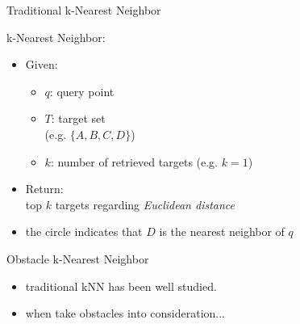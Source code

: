 \begin{frame}{Traditional k-Nearest Neighbor}
\begin{minipage}{.5\textwidth}
\small k-Nearest Neighbor:
\begin{itemize}
    \item<1-> \small Given:
    \begin{itemize}
        \item<2-> \small $q$: query point
        \item<3-> \small $T$: target set\\\tiny(e.g. $\{A,B,C,D\}$)
        \item<4-> \small $k$: number of retrieved targets \tiny(e.g. $k=1$)
    \end{itemize}
    \item<5-> \small Return:\\top $k$ targets regarding \textit{Euclidean distance}
    \item<6-> \small the circle indicates that $D$ is the nearest neighbor of $q$
\end{itemize}
\end{minipage}%
\begin{minipage}{.5\textwidth}
\begin{adjustbox}{max totalsize={.9\textwidth}{.9\textheight}, right}

\end{adjustbox}
\end{minipage}
\end{frame}

\begin{frame}{Obstacle k-Nearest Neighbor}
\begin{minipage}{.5\textwidth}
\begin{itemize}
    \item \small traditional kNN has been well studied.
    \item \small when take obstacles into consideration...
\end{itemize}
\end{minipage}%
\begin{minipage}{.5\textwidth}
\begin{adjustbox}{max totalsize={.9\textwidth}{.9\textheight}, right}
 {}
 {}
\end{adjustbox}
\end{minipage}
\end{frame}

